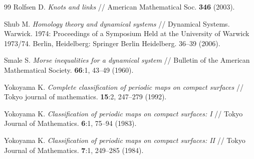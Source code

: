 \documentclass{amsart}
\numberwithin{equation}{section}
\begin{document}
\begin{thebibliography}{99}
		 Rolfsen D. {\it Knots and links} // American Mathematical Soc. {\bf 346} (2003).
		
		 Shub M. {\it Homology theory and dynamical systems} // Dynamical Systems. Warwick. 1974: Proceedings of a Symposium Held at the University of Warwick 1973/74.  Berlin, Heidelberg: Springer Berlin Heidelberg. 36--39 (2006).
		
		 Smale S. {\it Morse inequalities for a dynamical system} // Bulletin of the American Mathematical Society. {\bf 66}:1,  43--49 (1960).
		
		 	Yokoyama K. {\it Complete classification of periodic maps on compact surfaces} // Tokyo journal of mathematics. {\bf 15}:2, 247--279 (1992).
		
		 Yokoyama K. {\it Classification of periodic maps on compact surfaces: I} // Tokyo Journal of Mathematics. {\bf 6}:1, 75--94 (1983).
		
		 Yokoyama K. {\it Classification of periodic maps on compact surfaces: II} // Tokyo Journal of Mathematics. {\bf 7}:1, 249--285 (1984).
	\end{thebibliography}
\end{document}
